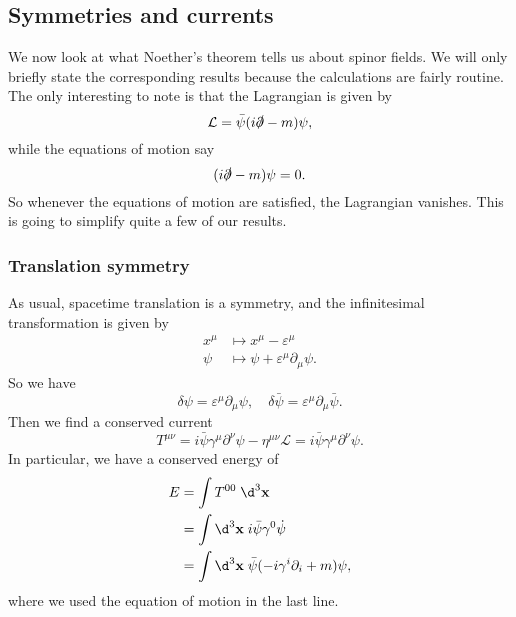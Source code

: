 \documentclass[a4paper]{article}
\begin{document}
\subsection{Symmetries and currents}
We now look at what Noether's theorem tells us about spinor fields. We will only briefly state the corresponding results because the calculations are fairly routine. The only interesting to note is that the Lagrangian is given by
\[
  \mathcal{L} = \bar\psi (i \slashed\partial - m) \psi,
\]
while the equations of motion say
\[
  (i \slashed\partial - m)\psi = 0.
\]
So whenever the equations of motion are satisfied, the Lagrangian vanishes. This is going to simplify quite a few of our results.

\subsubsection*{Translation symmetry}
As usual, spacetime translation is a symmetry, and the infinitesimal transformation is given by
\begin{align*}
  x^\mu &\mapsto x^\mu - \varepsilon^\mu\\
  \psi &\mapsto \psi + \varepsilon^\mu \partial_\mu\psi.
\end{align*}
So we have
\[
  \delta \psi = \varepsilon^\mu \partial_\mu \psi,\quad \delta \bar\psi = \varepsilon^\mu \partial_\mu \bar\psi.
\]
Then we find a conserved current
\[
  T^{\mu\nu} = i \bar\psi \gamma^\mu \partial^\nu \psi - \eta^{\mu\nu}\mathcal{L} = i \bar\psi \gamma^\mu \partial^\nu \psi.
\]
In particular, we have a conserved energy of
\begin{align*}
  E &= \int T^{00}\;\d^3 \mathbf{x} \\
  &= \int \d^3 \mathbf{x}\; i \bar\psi \gamma^0 \dot\psi \\
  &= \int \d^3 \mathbf{x}\; \bar\psi(-i \gamma^i \partial_i + m)\psi,
\end{align*}
where we used the equation of motion in the last line.
\end{document}

